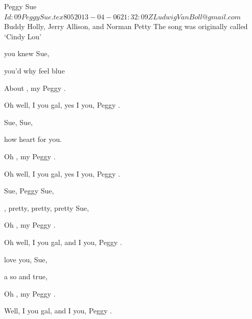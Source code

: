 \begin{SBSong}{Peggy Sue}
    {$Id: 09PeggySue.tex 805 2013-04-06 21:32:09Z LudwigVanBoll@gmail.com $}
    {Buddy Holly, Jerry Allison, and Norman Petty}
    {The song was originally called `Cindy Lou'}
  \begin{SBVerse}
	 you knew  Sue, 

	 you'd  why  feel blue 

	About , my Peggy .  

	Oh well, I  you gal, yes I  you, Peggy .   
  \end{SBVerse}
  \begin{SBVerse}
	 Sue,  Sue, 

	 how  heart  for you. 

	Oh , my Peggy .  

	Oh well, I  you gal, yes I  you, Peggy .   
  \end{SBVerse}
  \begin{SBVerse}
	 Sue, Peggy Sue, 

	, pretty, pretty, pretty  Sue, 

	Oh , my Peggy .  

	Oh well, I  you gal, and I  you,  Peggy .   
  \end{SBVerse}
  \begin{SBVerse}
	 love you,  Sue, 

	 a  so  and true, 

	Oh , my Peggy .  

	Well, I  you gal, and I  you,  Peggy .  
  \end{SBVerse}
\end{SBSong}
